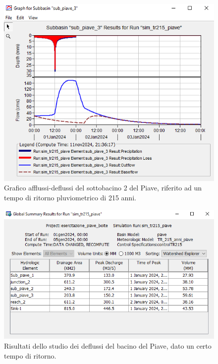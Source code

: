 \begin{figure}[H]\centering
        \includegraphics[scale=1]{immagini/sub3_piave_215.PNG}
        \caption{Grafico afflussi-deflussi del sottobacino 2 del Piave, riferito ad un tempo di ritorno pluviometrico di 215 anni.}
            \label{sub3_piave_215}    
\end{figure}    

    \begin{figure}[H]\centering
\includegraphics[scale=1]{immagini/risul_piave_215.PNG}
\caption{Risultati dello studio dei deflussi del bacino del Piave, dato un certo tempo di ritorno.}
\label{risul_piave_215}    
\end{figure}